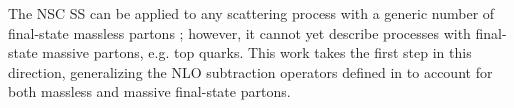 The NSC SS can be applied to any scattering process with a generic number of final-state massless partons \cite{rontsch-2509}; however, it cannot yet describe processes with final-state massive partons, e.g. top quarks. This work takes the first step in this direction, generalizing the NLO subtraction operators defined in \cite{rontsch-2023, rontsch-2503, rontsch-2509} to account for both massless and massive final-state partons.











